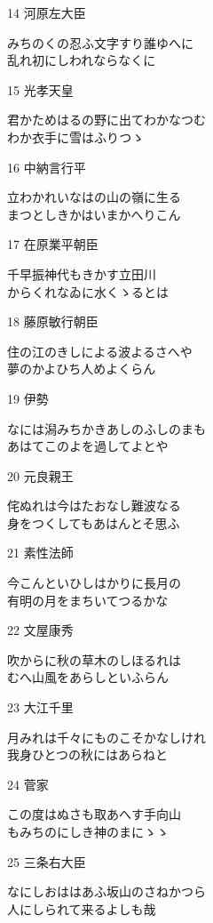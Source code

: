 \begin{shiika}
\end{shiika}14 河原左大臣   \begin{shiika}みちのくの忍ふ文字すり誰ゆへに\\乱れ初にしわれならなくに 
\end{shiika}15 光孝天皇     \begin{shiika}君かためはるの野に出てわかなつむ\\わか衣手に雪はふりつゝ 
\end{shiika}16 中納言行平   \begin{shiika}立わかれいなはの山の嶺に生る\\まつとしきかはいまかへりこん 
\end{shiika}17 在原業平朝臣 \begin{shiika}千早振神代もきかす立田川\\からくれなゐに水くゝるとは 
\end{shiika}18 藤原敏行朝臣 \begin{shiika}住の江のきしによる波よるさへや\\夢のかよひち人めよくらん 
\end{shiika}19 伊勢         \begin{shiika}なには潟みちかきあしのふしのまも\\あはてこのよを過してよとや 
\end{shiika}20 元良親王     \begin{shiika}侘ぬれは今はたおなし難波なる\\身をつくしてもあはんとそ思ふ 
\end{shiika}21 素性法師     \begin{shiika}今こんといひしはかりに長月の\\有明の月をまちいてつるかな 
\end{shiika}22 文屋康秀     \begin{shiika}吹からに秋の草木のしほるれは\\むへ山風をあらしといふらん 
\end{shiika}23 大江千里     \begin{shiika}月みれは千々にものこそかなしけれ\\我身ひとつの秋にはあらねと 
\end{shiika}24 菅家         \begin{shiika}この度はぬさも取あへす手向山\\もみちのにしき神のまにゝゝ 
\end{shiika}25 三条右大臣   \begin{shiika}なにしおははあふ坂山のさねかつら\\人にしられて来るよしも哉 

\end{shiika}
